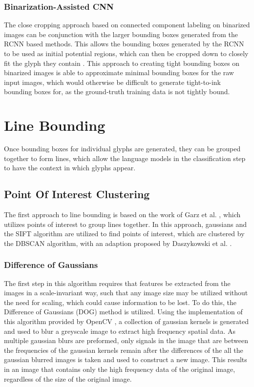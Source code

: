 \subsubsection{Binarization-Assisted CNN}

The close cropping approach based on connected component labeling on binarized images can be conjunction with the larger bounding boxes generated from the RCNN based methods. This allows the bounding boxes generated by the RCNN to be used as initial potential regions, which can then be cropped down to closely fit the glyph they contain . This approach to creating tight bounding boxes on binarized images is able to approximate minimal bounding boxes for the raw input images, which would otherwise be difficult to generate tight-to-ink bounding boxes for, as the ground-truth training data is not tightly bound.

\section{Line Bounding}

Once bounding boxes for individual glyphs are generated, they can be grouped together to form lines, which allow the language models in the classification step to have the context in which glyphs appear.

\subsection{Point Of Interest Clustering}

The first approach to line bounding is based on the work of Garz et al. \cite{Garz2011, Garz2012}, which utilizes points of interest to group lines together. In this approach, gaussians and the SIFT algorithm are utilized to find points of interest, which are clustered by the DBSCAN algorithm, with an adaption proposed by Daszykowski et al. \cite{Daszykowski}.

\subsubsection{Difference of Gaussians}

The first step in this algorithm requires that features be extracted from the images in a scale-invariant way, such that any image size may be utilized without the need for scaling, which could cause information to be lost. To do this, the Difference of Gaussians (DOG) method is utilized. Using the implementation of this algorithm provided by OpenCV \cite{OpenCV}, a collection of gaussian kernels is generated and used to blur a greyscale image to extract high frequency spatial data. As multiple gaussian blurs are preformed, only signals in the image that are between the frequencies of the gaussian kernels remain after the differences of the all the gaussian blurred images is taken and used to construct a new image. This results in an image that contains only the high frequency data of the original image, regardless of the size of the original image.

